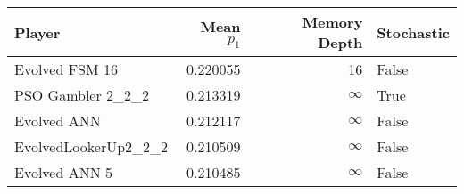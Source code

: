 \begin{tabular}{lrrl}
\toprule
               Player &  Mean $p_1$ &  Memory Depth & Stochastic \\
\midrule
       Evolved FSM 16 &    0.220055 &            16 &      False \\
    PSO Gambler 2\_2\_2 &    0.213319 &            \(\infty\) &       True \\
          Evolved ANN &    0.212117 &            \(\infty\) &      False \\
 EvolvedLookerUp2\_2\_2 &    0.210509 &            \(\infty\) &      False \\
        Evolved ANN 5 &    0.210485 &            \(\infty\) &      False \\
\bottomrule
\end{tabular}
